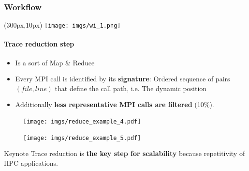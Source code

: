 \documentclass{beamer}
\begin{document}
\begin{frame}
\frametitle{Workflow}
\begin{textblock*}{5cm}(300px,10px) %
	\texttt{[image: imgs/wi\_1.png]}
\end{textblock*}
\framesubtitle{Trace reduction step}
\begin{multicols}{2}
\begin{itemize}
	\item Is a sort of Map \& Reduce
	\item Every MPI call is identified by its \textbf{signature}: Ordered sequence of pairs $(file,line)$ that define the call path, i.e. The dynamic position
	\item Additionally \textbf{less representative MPI calls are filtered} (10\%). 
\end{itemize}
\columnbreak
\begin{figure}
	\texttt{[image: imgs/reduce\_example\_4.pdf]}
\end{figure}
\begin{figure}
	\texttt{[image: imgs/reduce\_example\_5.pdf]}
\end{figure}	
\end{multicols}
\pause
\begin{block}{Keynote}
	Trace reduction is \textbf{the key step for scalability} because repetitivity of HPC applications.
\end{block}
\end{frame}
\end{document}
